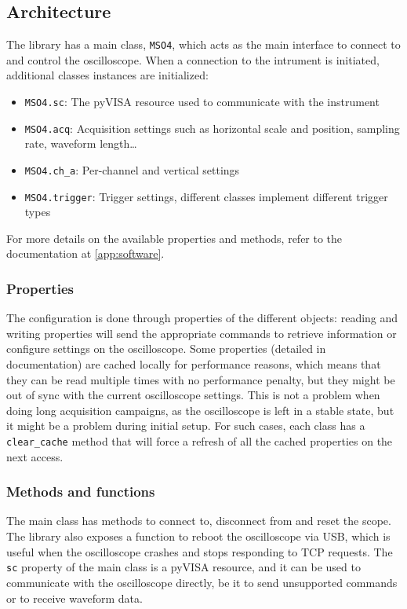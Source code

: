 \documentclass[a4paper,english,twoside,10pt]{article}
\begin{document}
\subsection{Architecture}
The library has a main class, \texttt{MSO4}, which acts as the main interface to connect to and control the oscilloscope. When a connection to the intrument is initiated, additional classes instances are initialized:
\begin{itemize}
	\item \texttt{MSO4.sc}: The pyVISA resource used to communicate with the instrument
	\item \texttt{MSO4.acq}: Acquisition settings such as horizontal scale and position, sampling rate, waveform length\ldots
	\item \texttt{MSO4.ch\_a}: Per-channel and vertical settings
	\item \texttt{MSO4.trigger}: Trigger settings, different classes implement different trigger types
\end{itemize}

For more details on the available properties and methods, refer to the documentation at \autoref{app:software}.

\subsubsection{Properties}
The configuration is done through properties of the different objects: reading and writing properties will send the appropriate commands to retrieve information or configure settings on the oscilloscope. Some properties (detailed in documentation) are cached locally for performance reasons, which means that they can be read multiple times with no performance penalty, but they might be out of sync with the current oscilloscope settings. This is not a problem when doing long acquisition campaigns, as the oscilloscope is left in a stable state, but it might be a problem during initial setup. For such cases, each class has a \texttt{clear\_cache} method that will force a refresh of all the cached properties on the next access.

\subsubsection{Methods and functions}
The main class has methods to connect to, disconnect from and reset the scope. The library also exposes a function to reboot the oscilloscope via USB, which is useful when the oscilloscope crashes and stops responding to TCP requests. The \texttt{sc} property of the main class is a pyVISA resource, and it can be used to communicate with the oscilloscope directly, be it to send unsupported commands or to receive waveform data.
\end{document}
